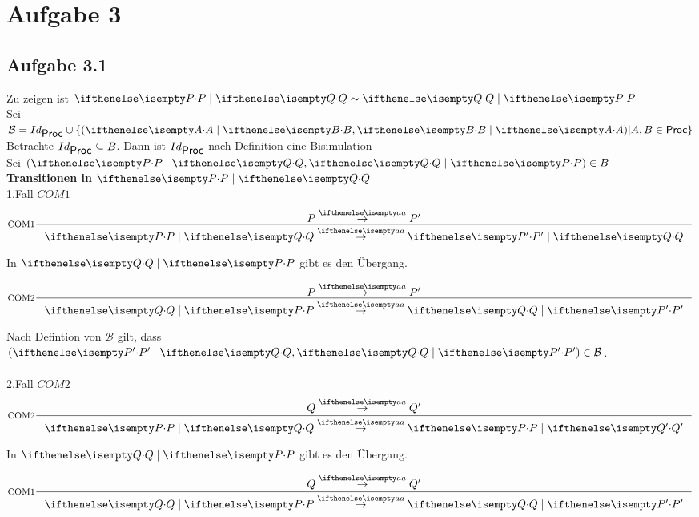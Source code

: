 \section{Aufgabe 3}

\subsection{Aufgabe 3.1}

Zu zeigen ist $\Par{P}{Q} \bisim \Par{Q}{P}$ \\
Sei $\mathcal{B} = Id_{\Proc} \cup \{ (\Par{A}{B},\Par{B}{A}) | A,B \in \Proc \}$ \\

Betrachte $Id_{\mbox{\sf Proc}} \subseteq B$. Dann ist $Id_{\mbox{\sf Proc}}$ nach Definition eine Bisimulation\\

Sei $(\Par {P}{Q},\Par {Q}{P}) \in B$ \\

\textbf{Transitionen in $\Par {P}{Q}$}\\

1.Fall $COM1$ \\
\begin{displaymath}
    \inference[COM1]
    {
      P \CCSTrans{a} P'
    }
    {
        \Par{P}{Q} \CCSTrans{a} \Par{P'}{Q}
    }
\end{displaymath}

In $\Par {Q}{P}$ gibt es den Übergang.

\begin{displaymath}
    \inference[COM2]
    {
      P \CCSTrans{a} P'
    }
    {
        \Par{Q}{P} \CCSTrans{a} \Par{Q}{P'}
    }
\end{displaymath}

Nach Defintion von $\mathcal{B}$ gilt, dass $(\Par{P'}{Q},\Par{Q}{P'}) \in \mathcal{B}$.\\
\\
2.Fall $COM2$ \\
\begin{displaymath}
    \inference[COM2]
    {
      Q \CCSTrans{a} Q'
    }
    {
        \Par{P}{Q} \CCSTrans{a} \Par{P}{Q'}
    }
\end{displaymath}

In $\Par {Q}{P}$ gibt es den Übergang.

\begin{displaymath}
    \inference[COM1]
    {
      Q \CCSTrans{a} Q'
    }
    {
        \Par{Q}{P} \CCSTrans{a} \Par{Q}{P'}
    }
\end{displaymath}


